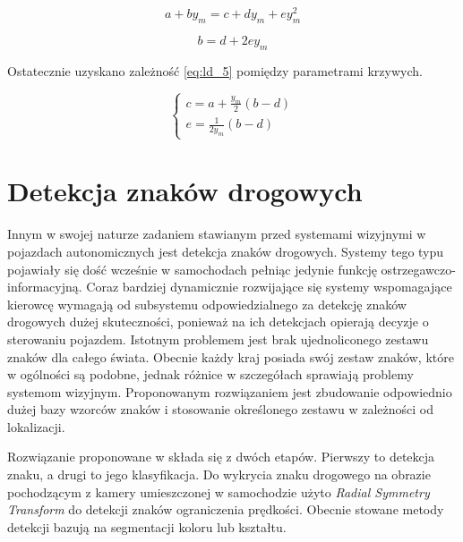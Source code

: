 \begin{equation}
a+by_{m}=c+dy_{m}+ey_{m}^{2}
\end{equation}

\begin{equation}
b = d+2ey_m
\end{equation}

Ostatecznie uzyskano zależność \ref{eq:ld_5} pomiędzy parametrami krzywych.

\begin{equation}
\begin{cases} c=a+\frac{y_{m}}{2}(b-d) \\
e=\frac{1}{2y_{m}}(b-d) \end{cases}
\end{equation}


\section{Detekcja znaków drogowych}

Innym w swojej naturze zadaniem stawianym przed systemami wizyjnymi w pojazdach autonomicznych jest detekcja znaków drogowych. Systemy tego typu pojawiały się dość wcześnie w samochodach pełniąc jedynie funkcję ostrzegawczo-informacyjną. Coraz bardziej dynamicznie rozwijające się systemy wspomagające kierowcę wymagają od subsystemu odpowiedzialnego za detekcję znaków drogowych dużej skuteczności, ponieważ na ich detekcjach opierają decyzje o sterowaniu pojazdem. Istotnym problemem jest brak ujednoliconego zestawu znaków dla całego świata. Obecnie każdy kraj posiada swój zestaw znaków, które w ogólności są podobne, jednak różnice w szczegółach sprawiają problemy systemom wizyjnym. Proponowanym rozwiązaniem jest zbudowanie odpowiednio dużej bazy wzorców znaków i stosowanie określonego zestawu w zależności od lokalizacji. 

Rozwiązanie proponowane w \cite{T2} składa się z dwóch etapów. Pierwszy to detekcja znaku, a drugi to jego klasyfikacja. Do wykrycia znaku drogowego na obrazie pochodzącym z kamery umieszczonej w samochodzie użyto \textit{Radial Symmetry Transform} do detekcji znaków ograniczenia prędkości. Obecnie stowane metody detekcji bazują na segmentacji koloru lub kształtu. 

